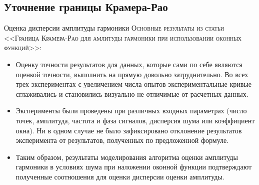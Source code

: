 \subsection{Уточнение границы Крамера-Рао}
\begin{frame}{Оценка дисперсии амплитуды гармоники}
	\textsc{Основные результаты из статьи <<Граница Крамера-Рао для амлитуды гармоники при использовании оконных функций>>}:
\begin{itemize}
\item Оценку точности результатов для данных, которые сами по себе являются оценкой точности, выполнить на прямую довольно затруднительно. Во всех трех экспериментах с увеличением числа опытов экспериментальные кривые сглаживались и становились визуально не отличимые от расчетных данных.
\item Эксперименты были проведены при различных входных параметрах (число точек, амплитуда, частота и фаза сигналов, дисперсия шума или коэффициент окна). Ни в одном случае не было зафиксировано отклонение результатов эксперимента от результатов, полученных по предложенной формуле.
\item Таким образом, результаты моделирования алгоритма оценки амплитуды гармоники в условиях шума при наложении оконной функции подтверждают полученные соотношения для оценки дисперсии оценки амплитуды.
\end{itemize}	
\end{frame}

